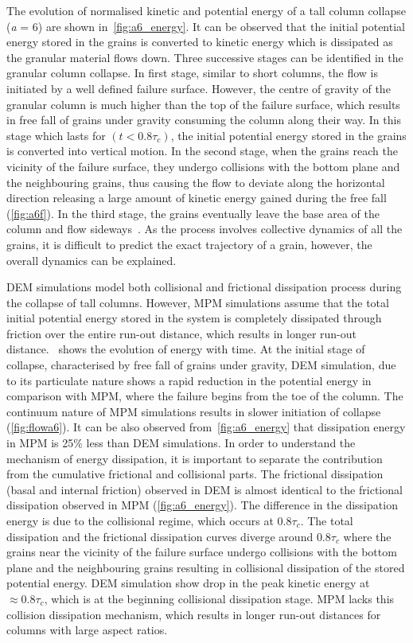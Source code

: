 The evolution of normalised kinetic and potential energy of a tall column 
collapse (\textit{a} = 6) are shown in~\cref{fig:a6_energy}. It can be 
observed that the initial potential energy stored in the 
grains is converted to kinetic energy which is dissipated as the granular 
material flows down. Three successive stages can be identified in the granular 
column collapse. In first stage, similar to short columns, the flow is 
initiated by a well defined failure surface. However, the centre of gravity of 
the granular column is much 
higher than the top of the failure surface, which results in free fall of 
grains under gravity 
consuming the column along their way. In this stage which lasts for
$(t<0.8\tau_{c})$, the initial potential energy stored in the grains is 
converted into vertical motion. In the second stage, when the grains reach the 
vicinity of the failure surface, they undergo collisions with the bottom plane 
and the neighbouring grains, thus causing the flow to deviate along the 
horizontal direction releasing a large amount of kinetic energy gained during 
the free fall (\cref{fig:a6f}). In the third stage, the grains eventually 
leave the base area of the column and flow sideways~\citep{Lajeunesse2004}. As 
the process involves collective dynamics of all the grains, it is difficult 
to predict the exact trajectory of a grain, however, the overall dynamics can 
be explained. 


DEM simulations model both collisional and frictional dissipation process 
during the collapse of tall columns. However, MPM simulations assume that the 
total initial potential energy stored in the system is completely dissipated 
through friction over the entire run-out distance, which results in longer 
run-out distance.~ shows the evolution of energy with time. 
At the initial stage of collapse, characterised by free fall of grains under 
gravity, DEM simulation, due to its particulate nature shows a rapid reduction 
in the potential energy in comparison with MPM, where the failure begins from 
the toe of the column. The continuum nature of MPM simulations results in 
slower 
initiation of collapse (\cref{fig:flowa6}). It can be also observed 
from~\cref{fig:a6_energy} that dissipation energy in MPM is 25\% less than DEM 
simulations. In order to understand the mechanism of energy dissipation, it is 
important to separate the contribution from the cumulative frictional and 
collisional parts. The frictional dissipation (basal and internal friction) 
observed in DEM is almost identical to the frictional dissipation observed in 
MPM (\cref{fig:a6_energy}). The difference in the dissipation energy is due to 
the collisional regime, which occurs at $0.8\tau_c$. The total dissipation and 
the frictional dissipation curves diverge around $0.8\tau_c$ where the grains 
near the vicinity of the failure surface undergo collisions with the bottom 
plane and the neighbouring grains resulting in collisional dissipation of the 
stored potential energy. DEM simulation show drop in the peak kinetic energy at 
$\approx0.8\tau_c$, which is at the beginning collisional dissipation stage. 
MPM lacks this collision dissipation mechanism, which results in longer run-out 
distances for columns with large aspect ratios. 

